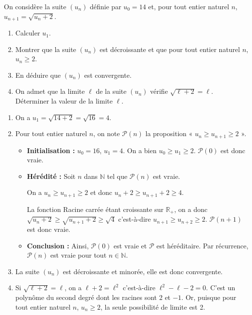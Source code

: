 \documentclass[11pt,fleqn, openany]{book} %
\begin{document}
\begin{exercise}On considère la suite $(u_n)$ définie par $u_0=14$ et, pour tout entier naturel $n$, $u_{n+1}=\sqrt{u_n+2}$.
\begin{enumerate}
\item Calculer $u_1$.
\item Montrer que la suite $(u_n)$ est décroissante et que pour tout entier naturel $n$, $u_n \geqslant 2$.
\item En déduire que $(u_n)$ est convergente.
\item On admet que la limite $\ell$ de la suite $(u_n)$ vérifie $\sqrt{\ell+2}=\ell$. Déterminer la valeur de la limite $\ell$.
\end{enumerate}\end{exercise}

\begin{solution}\hspace{0pt}
\begin{enumerate}
\item On a $u_1=\sqrt{14+2}=\sqrt{16}=4$.

\item Pour tout entier naturel $n$, on note $\mathcal{P}(n)$ la proposition « $u_n\geqslant u _{n+1} \geqslant 2$ ».

\begin{itemize}
\item \textbf{Initialisation :} $u_0=16$, $u_1=4$. On a bien $u_0 \geqslant u_1 \geqslant 2$. $\mathcal{P}(0)$ est donc vraie.
\item \textbf{Hérédité :} Soit $n$ dans $\mathbb{N}$ tel que $\mathcal{P}(n)$ est vraie. 

On a $u_n\geqslant u _{n+1} \geqslant 2$ et donc $u_n+2\geqslant u _{n+1}+2 \geqslant 4$.

La fonction Racine carrée étant croissante sur $\mathbb{R}_+$, on a donc $\sqrt{u_n+2}\geqslant \sqrt{u_{n+1}+2} \geqslant \sqrt{4}$ c'est-à-dire $u_{n+1}\geqslant u _{n+2} \geqslant 2$. $\mathcal{P}(n+1)$ est donc vraie.
\item \textbf{Conclusion :} Ainsi, $\mathcal{P}(0)$ est vraie et $\mathcal{P}$ est héréditaire. Par récurrence, $\mathcal{P}(n)$ est vraie pour tout $n\in\mathbb{N}$.
\end{itemize}

\item La suite $(u_n)$ est décroissante et minorée, elle est donc convergente.

\item Si $\sqrt{\ell+2}=\ell$, on a $\ell+2=\ell^2$ c'est-à-dire $\ell^2-\ell-2=0$. C'est un polynôme du second degré dont les racines sont 2 et $-1$. Or, puisque pour tout entier naturel $n$, $u_n \geqslant 2$, la seule possibilité de limite est 2.\end{enumerate}\end{solution}
\end{document}
